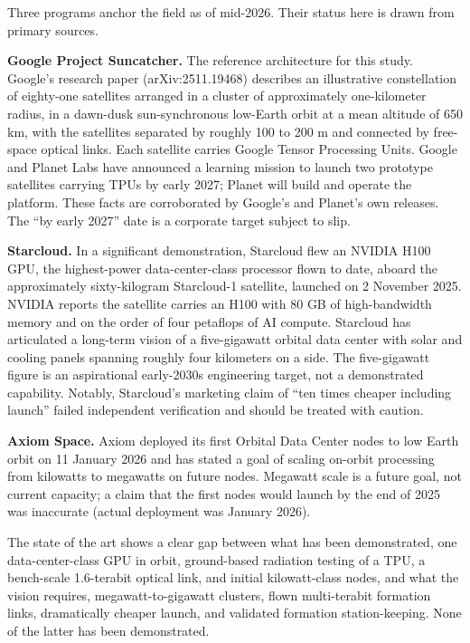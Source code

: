 \documentclass[
  11pt,
  openany,
  oneside]{book}
\begin{document}
Three programs anchor the field as of mid-2026. Their status here is
drawn from primary sources.

\textbf{Google Project Suncatcher.} The reference architecture for this
study. Google's research paper (arXiv:2511.19468) describes an
illustrative constellation of eighty-one satellites arranged in a
cluster of approximately one-kilometer radius, in a dawn-dusk
sun-synchronous low-Earth orbit at a mean altitude of 650 km, with the
satellites separated by roughly 100 to 200 m and connected by free-space
optical links. Each satellite carries Google Tensor Processing Units.
Google and Planet Labs have announced a learning mission to launch two
prototype satellites carrying TPUs by early 2027; Planet will build and
operate the platform. These facts are corroborated by Google's and
Planet's own releases. The ``by early 2027'' date is a corporate target
subject to slip.

\textbf{Starcloud.} In a significant demonstration, Starcloud flew an
NVIDIA H100 GPU, the highest-power data-center-class processor flown to
date, aboard the approximately sixty-kilogram Starcloud-1 satellite,
launched on 2 November 2025. NVIDIA reports the satellite carries an
H100 with 80 GB of high-bandwidth memory and on the order of four
petaflops of AI compute. Starcloud has articulated a long-term vision of
a five-gigawatt orbital data center with solar and cooling panels
spanning roughly four kilometers on a side. The five-gigawatt figure is
an aspirational early-2030s engineering target, not a demonstrated
capability. Notably, Starcloud's marketing claim of ``ten times cheaper
including launch'' failed independent verification and should be treated
with caution.

\textbf{Axiom Space.} Axiom deployed its first Orbital Data Center nodes
to low Earth orbit on 11 January 2026 and has stated a goal of scaling
on-orbit processing from kilowatts to megawatts on future nodes.
Megawatt scale is a future goal, not current capacity; a claim that the
first nodes would launch by the end of 2025 was inaccurate (actual
deployment was January 2026).

The state of the art shows a clear gap between what has been
demonstrated, one data-center-class GPU in orbit, ground-based radiation
testing of a TPU, a bench-scale 1.6-terabit optical link, and initial
kilowatt-class nodes, and what the vision requires, megawatt-to-gigawatt
clusters, flown multi-terabit formation links, dramatically cheaper
launch, and validated formation station-keeping. None of the latter has
been demonstrated.
\end{document}
